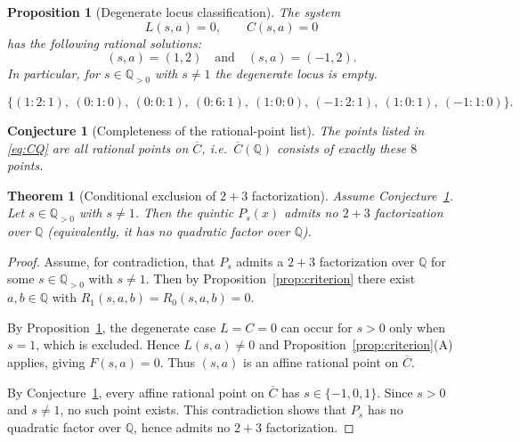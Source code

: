 \documentclass[10pt,a4paper]{amsart}
\newtheorem{proposition}{Proposition}
\newtheorem{conjecture}{Conjecture}
\newtheorem{theorem}{Theorem}
\begin{document}
\begin{proposition}[Degenerate locus classification]\label{prop:degenerate}
The system
\[
L(s,a)=0,\qquad C(s,a)=0
\]
has the following rational solutions:
\[
(s,a)=(1,2)\quad\text{and}\quad (s,a)=(-1,2).
\]
In particular, for $s\in\mathbb{Q}_{>0}$ with $s\neq 1$ the degenerate locus is empty.
\end{proposition}

\begin{equation}\label{eq:CQ}
\{(1:2:1),\ (0:1:0),\ (0:0:1),\ (0:6:1),\ (1:0:0),\ (-1:2:1),\ (1:0:1),\ (-1:1:0)\}.
\end{equation}

\begin{conjecture}[Completeness of the rational-point list]\label{conj:complete}
The points listed in \eqref{eq:CQ} are all rational points on $\overline{C}$, i.e.\ $\overline{C}(\mathbb{Q})$ consists of exactly these $8$ points.
\end{conjecture}

\begin{theorem}[Conditional exclusion of $2+3$ factorization]\label{thm:main}
Assume Conjecture~\ref{conj:complete}.
Let $s\in\mathbb{Q}_{>0}$ with $s\neq 1$.
Then the quintic $P_s(x)$ admits no $2+3$ factorization over $\mathbb{Q}$ (equivalently, it has no quadratic factor over $\mathbb{Q}$).
\end{theorem}

\begin{proof}
Assume, for contradiction, that $P_s$ admits a $2+3$ factorization over $\mathbb{Q}$ for some $s\in\mathbb{Q}_{>0}$ with $s\neq 1$.
Then by Proposition~\ref{prop:criterion} there exist $a,b\in\mathbb{Q}$ with $R_1(s,a,b)=R_0(s,a,b)=0$.

By Proposition~\ref{prop:degenerate}, the degenerate case $L=C=0$ can occur for $s>0$ only when $s=1$, which is excluded.
Hence $L(s,a)\neq 0$ and Proposition~\ref{prop:criterion}(A) applies, giving $F(s,a)=0$.
Thus $(s,a)$ is an affine rational point on $\overline{C}$.

By Conjecture~\ref{conj:complete}, every affine rational point on $\overline{C}$ has $s\in\{-1,0,1\}$.
Since $s>0$ and $s\neq 1$, no such point exists.
This contradiction shows that $P_s$ has no quadratic factor over $\mathbb{Q}$, hence admits no $2+3$ factorization.
\end{proof}
\end{document}
